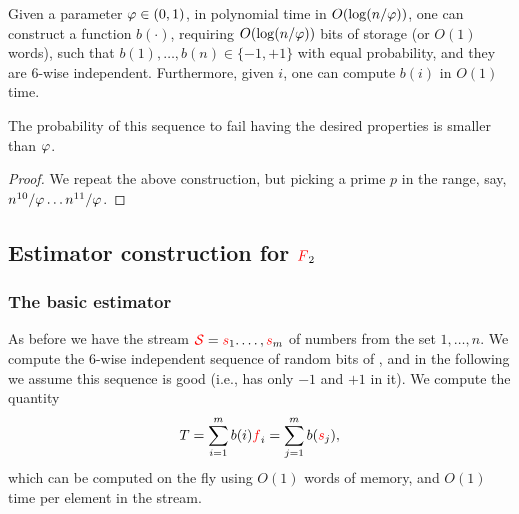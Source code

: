 \begin{lemma}
    Given a parameter $\varphi \in (0,1)$, in polynomial time in
    $O(\log (n/\varphi))$, one can construct a function $b(\cdot)$,
    requiring $O( \log (n/\varphi))$ bits of storage (or $O(1)$
    words), such that $b(1), \ldots, b(n) \in \{-1,+1\}$ with equal
    probability, and they are $6$-wise independent. Furthermore, given
    $i$, one can compute $b(i)$ in $O(1)$ time.

    The probability of this sequence to fail having the desired
    properties is smaller than $\varphi$.
\end{lemma}
\begin{proof}
    We repeat the above construction, but picking a prime $p$ in the
    range, say, $n^{10}/ \varphi \ldots n^{11} /\varphi$.
\end{proof}




\subsection{Estimator construction for ${\textcolor{red}{F}}_2$}
\subsubsection{The basic estimator}

As before we have the stream ${\textcolor{red}{\mathcal{S}}} = {\textcolor{red}{{s}}}_1.\ldots, {\textcolor{red}{{s}}}_m$ of
numbers from the set $1, \ldots, n$. We compute the $6$-wise
independent sequence of random bits of
, and in the following we assume
this sequence is good (i.e., has only $-1$ and $+1$ in it). We compute
the quantity
\begin{equation*}
    T = \sum_{i=1}^m b(i) \frq_i%
    =%
    \sum_{j=1}^m b( \strm_j),
\end{equation*}
which can be computed on the fly using $O(1)$ words of memory, and
$O(1)$ time per element in the stream.



